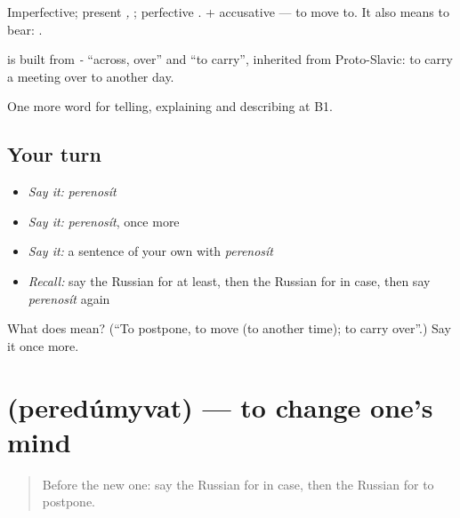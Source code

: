 Imperfective; present \emph{, }; perfective \emph{}. \emph{ } + accusative — to move to. It also means to bear: \emph{  }.

\begin{cousinweb}
\textbf{} is built from \emph{-} \textquotedblleft{}across, over\textquotedblright{} and \emph{} \textquotedblleft{}to carry\textquotedblright{}, inherited from Proto-Slavic: to carry a meeting over to another day.
\end{cousinweb}

\begin{grammarlens}[title={What you've built}]
One more word for telling, explaining and describing at B1.
\end{grammarlens}

\subsection*{Your turn}
\begin{itemize}
\raggedright
  \item \emph{Say it:} \emph{perenosít}
  \item \emph{Say it:} \emph{perenosít}, once more
  \item \emph{Say it:} a sentence of your own with \emph{perenosít}
  \item \emph{Recall:} say the Russian for at least, then the Russian for in case, then say \emph{perenosít} again
\end{itemize}

\begin{tcolorbox}[breakable,colback=teal!4,colframe=teal!35!black,title={Before you move on}]
What does  mean? (\textquotedblleft{}To postpone, to move (to another time); to carry over\textquotedblright{}.) Say it once more.
\end{tcolorbox}
\section[\texorpdfstring{\ru{передумывать} (peredúmyvat)}{передумывать (peredúmyvat)}]{ (peredúmyvat) — to change one’s mind}

\label{lesson:RU-C377-peredumyvat}



\begin{quote}
Before the new one: say the Russian for in case, then the Russian for to postpone.
\end{quote}

